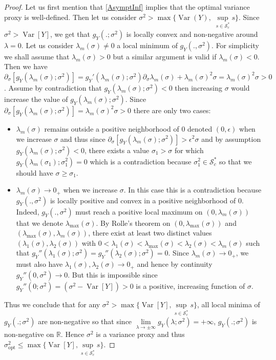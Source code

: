\documentclass[a4paper, 10pt]{article}
\theoremstyle{definition}
\begin{document}
\begin{proof}Let us first mention that \autoref{AsymptInf} implies that the optimal variance proxy is well-defined. Then let us consider $\sigma^2>\max\big\{ \operatorname{Var}(Y),\; \underset{s \in \mathcal{S}_c^*}{\sup} s \big\}$. Since $\sigma^2>\operatorname{Var}[Y]$, we get that $g_Y(.;\sigma^2)$ is locally convex and non-negative around $\lambda=0$.  Let us consider $\lambda_m(\sigma)\neq 0$ a local minimum of $g_Y(.,\sigma^2)$. For simplicity we shall assume that $\lambda_m(\sigma)>0$ but a similar argument is valid if $\lambda_m(\sigma)<0$. Then we have $\partial_{\sigma}[g_Y(\lambda_m(\sigma);\sigma^2)]= g_Y'(\lambda_m(\sigma);\sigma^2) \partial_\sigma \lambda_m(\sigma) + \lambda_m(\sigma)^2\sigma= \lambda_m(\sigma)^2\sigma>0$. Assume by contradiction that $g_Y(\lambda_m(\sigma);\sigma^2)<0$ then increasing $\sigma$ would increase the value of $g_Y(\lambda_m(\sigma);\sigma^2)$. Since $\partial_{\sigma}[g_Y(\lambda_m(\sigma);\sigma^2)]=\lambda_m(\sigma)^2\sigma>0$ there are only two cases: 
\begin{itemize}\item $\lambda_m(\sigma)$ remains outside a positive neighborhood of $0$ denoted $(0,\epsilon)$ when we increase $\sigma$ and thus since $\partial_{\sigma}[g_Y(\lambda_m(\sigma);\sigma^2)]>\epsilon^2 \sigma$ and by assumption $g_Y(\lambda_m(\sigma);\sigma^2)<0$, there exists a value $\sigma_1>\sigma$ for which $g_Y(\lambda_m(\sigma_1);\sigma_1^2)=0$ which is a contradiction because $\sigma_1^2\in \mathcal{S}_c^*$ so that we should have $\sigma\geq \sigma_1$.
\item $\lambda_m(\sigma)\to 0_+$ when we increase $\sigma$. In this case this is a contradiction because $g_Y(.,\sigma^2)$ is locally positive and convex in a positive neighborhood of $0$. Indeed, $g_Y(.,\sigma^2)$ must reach a positive local maximum on $(0,\lambda_m(\sigma))$ that we denote $\lambda_{\text{max}}(\sigma)$. By Rolle's theorem on $(0,\lambda_{\text{max}}(\sigma))$ and $(\lambda_{\text{max}}(\sigma),\lambda_m(\sigma))$, there exist at least two distinct values $(\lambda_1(\sigma),\lambda_2(\sigma))$ with $0<\lambda_1(\sigma)<\lambda_{\text{max}}(\sigma)<\lambda_2(\sigma)<\lambda_m(\sigma)$ such that $g_Y''(\lambda_1(\sigma);\sigma^2)=g_Y''(\lambda_2(\sigma);\sigma^2)=0$. Since $\lambda_m(\sigma)\to 0_+$, we must also have $\lambda_1(\sigma),\lambda_2(\sigma)\to 0_+$ and hence by continuity $g_Y''(0,\sigma^2)\to 0$. But this is impossible since $g_Y''(0;\sigma^2)=(\sigma^2-\operatorname{Var}[Y])>0$ is a positive, increasing function of $\sigma$. 
\end{itemize}
Thus we conclude that for any $\sigma^2>\max\big\{\operatorname{Var}[Y],\underset{s\in \mathcal{S}_c^*}{\sup} s\big\}$, all local minima of $g_Y(.;\sigma^2)$ are non-negative so that since $\underset{\lambda\to \pm \infty}{\lim} g_Y(\lambda;\sigma^2)=+\infty$, $g_Y(.;\sigma^2)$ is non-negative on $\mathbb{R}$. Hence $\sigma^2$ is a variance proxy and thus $\sigma_{\mathrm{opt}}^2\leq \max\big\{\operatorname{Var}[Y],\underset{s\in \mathcal{S}_c^*}{\sup} s\big\}$.


\end{proof}
\end{document}
